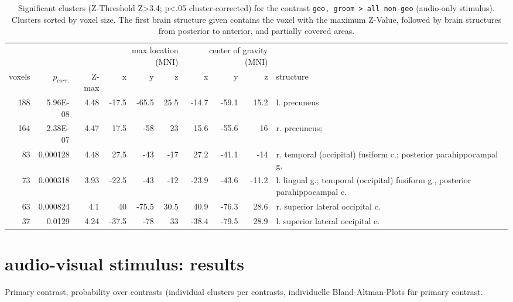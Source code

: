 \documentclass[english]{article}
\begin{document}
\begin{table}[t]
    \caption{Significant clusters (Z-Threshold Z>3.4; p<.05 cluster-corrected) for the contrast \texttt{geo, groom > all non-geo} (audio-only stimulus).
Clusters sorted by voxel size.
The first brain structure given contains the voxel with the maximum Z-Value, followed by brain structures from posterior to anterior, and partially covered areas.}
\label{tab:res-ao-group1}
\begin{tabular}{rrrrrrrrrp{3cm}}
\toprule
& & & \multicolumn{3}{r}{max location (MNI)} & \multicolumn{3}{r}{center of gravity (MNI)} &
\\ \cmidrule{4-6} \cmidrule{7-9}
voxels & $p_{corr.}$ & Z-max & x & y & z  & x & y & z & structure \\
\midrule
188 & 5.96E-08 & 4.48 & -17.5 & -65.5 & 25.5 & -14.7 & -59.1 & 15.2 & l. precuneus \\
164 & 2.38E-07 & 4.47 & 17.5 & -58 & 23 & 15.6 & -55.6 & 16 & r. precuneus; \\
83 & 0.000128 & 4.48 & 27.5 & -43 & -17 & 27.2 & -41.1 & -14 & r. temporal (occipital) fusiform c.; posterior parahippocampal g. \\
73 & 0.000318 & 3.93 & -22.5 & -43 & -12 & -23.9 & -43.6 & -11.2 & l. lingual g.; temporal (occipital) fusiform g., posterior parahippocampal c. \\
63 & 0.000824 & 4.1 & 40 & -75.5 & 30.5 & 40.9 & -76.3 & 28.6 & r. superior lateral occipital c. \\
37 & 0.0129 & 4.24 & -37.5 & -78 & 33 & -38.4 & -79.5 & 28.9 & l. superior lateral occipital c. \\
\bottomrule
\end{tabular}
\end{table}


\section{audio-visual stimulus: results}
Primary contrast, probability over contrasts (individual clusters per contrasts,
individuelle Bland-Altman-Plots für primary contrast.
\end{document}
